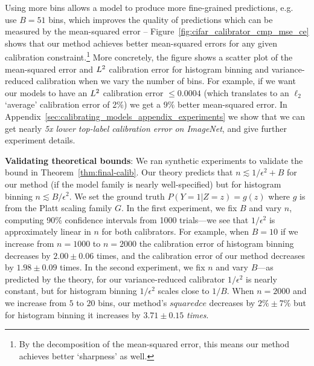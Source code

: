 Using more bins allows a model to produce more fine-grained predictions, e.g.~\cite{brocker2012empirical} use $B = 51$ bins, which improves the quality of predictions which can be measured by the mean-squared error -- Figure~\ref{fig:cifar_calibrator_cmp_mse_ce} shows that our method achieves better mean-squared errors for any given calibration constraint.\footnote{By the decomposition of the mean-squared error, this means our method achieves better `sharpness' as well.} More concretely, the figure shows a scatter plot of the mean-squared error and $L^2{}$ calibration error for histogram binning and variance-reduced calibration when we vary the number of bins. For example, if we want our models to have an $L^2{}$ calibration error $\leq 0.0004$ (which translates to an $\ell_2$ `average' calibration error of 2\%) we get a $9\%$ better mean-squared error. In Appendix~\ref{sec:calibrating_models_appendix_experiments} we show that we can get nearly \emph{5x lower top-label calibration error on ImageNet}, and give further experiment details.

\textbf{Validating theoretical bounds}: We ran synthetic experiments to validate the bound in Theorem~\ref{thm:final-calib}. Our theory predicts that $n \lesssim 1/\epsilon^2 + B$ for our method (if the model family is nearly well-specified) but for histogram binning $n \lesssim B/\epsilon^2$. We set the ground truth $P(Y = 1 | Z=z) = g(z)$ where $g$ is from the Platt scaling family $G$. In the first experiment, we fix $B$ and vary $n$, computing 90\% confidence intervals from 1000 trials---we see that $1/\epsilon^2$ is approximately linear in $n$ for both calibrators. For example, when $B=10$ if we increase from $n=1000$ to $n=2000$ the calibration error of histogram binning decreases by $2.00 \pm 0.06$ times, and the calibration error of our method decreases by $1.98 \pm 0.09$ times. In the second experiment, we fix $n$ and vary $B$---as predicted by the theory, for our variance-reduced calibrator $1/\epsilon^2$ is nearly constant, but for histogram binning $1/\epsilon^2$ scales close to $1/B$. When $n = 2000$ and we increase from $5$ to $20$ bins, our method's $squaredce$ decreases by $2\% \pm 7\%$ but for histogram binning it increases by $3.71 \pm 0.15$ \emph{times}. 

